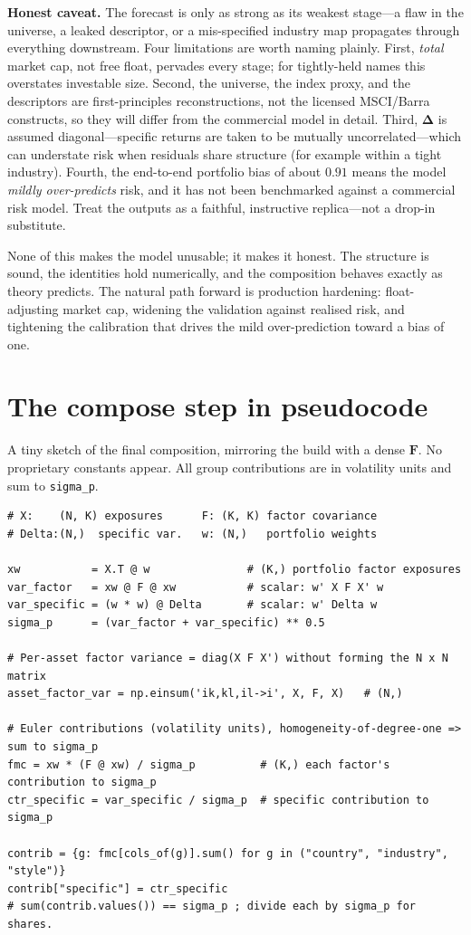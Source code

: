 \documentclass[11pt]{article}
\theoremstyle{definition}
\theoremstyle{plain}
\theoremstyle{remark}
\newcommand{\Fmat}{\mathbf{F}}
\newcommand{\Del}{\boldsymbol{\Delta}}
\begin{document}
\begin{pitfall}
\textbf{Honest caveat.} The forecast is only as strong as its weakest stage---a flaw in the universe, a leaked descriptor, or a mis-specified industry map propagates through everything downstream. Four limitations are worth naming plainly. First, \emph{total} market cap, not free float, pervades every stage; for tightly-held names this overstates investable size. Second, the universe, the index proxy, and the descriptors are first-principles reconstructions, not the licensed MSCI/Barra constructs, so they will differ from the commercial model in detail. Third, $\Del$ is assumed diagonal---specific returns are taken to be mutually uncorrelated---which can understate risk when residuals share structure (for example within a tight industry). Fourth, the end-to-end portfolio bias of about $0.91$ means the model \emph{mildly over-predicts} risk, and it has not been benchmarked against a commercial risk model. Treat the outputs as a faithful, instructive replica---not a drop-in substitute.
\end{pitfall}

None of this makes the model unusable; it makes it honest. The structure is sound, the identities hold numerically, and the composition behaves exactly as theory predicts. The natural path forward is production hardening: float-adjusting market cap, widening the validation against realised risk, and tightening the calibration that drives the mild over-prediction toward a bias of one.

\appendix
\section{The compose step in pseudocode}

A tiny sketch of the final composition, mirroring the build with a dense $\Fmat$. No proprietary constants appear. All group contributions are in volatility units and sum to \texttt{sigma\_p}.

{\footnotesize
\begin{verbatim}
# X:    (N, K) exposures      F: (K, K) factor covariance
# Delta:(N,)  specific var.   w: (N,)   portfolio weights

xw           = X.T @ w               # (K,) portfolio factor exposures
var_factor   = xw @ F @ xw           # scalar: w' X F X' w
var_specific = (w * w) @ Delta       # scalar: w' Delta w
sigma_p      = (var_factor + var_specific) ** 0.5

# Per-asset factor variance = diag(X F X') without forming the N x N matrix
asset_factor_var = np.einsum('ik,kl,il->i', X, F, X)   # (N,)

# Euler contributions (volatility units), homogeneity-of-degree-one => sum to sigma_p
fmc = xw * (F @ xw) / sigma_p          # (K,) each factor's contribution to sigma_p
ctr_specific = var_specific / sigma_p  # specific contribution to sigma_p

contrib = {g: fmc[cols_of(g)].sum() for g in ("country", "industry", "style")}
contrib["specific"] = ctr_specific
# sum(contrib.values()) == sigma_p ; divide each by sigma_p for shares.
\end{verbatim}
}
\end{document}

